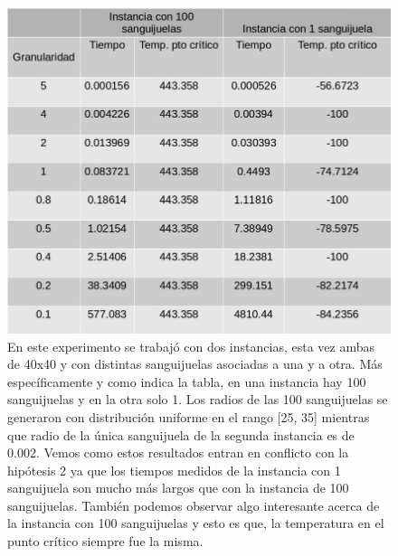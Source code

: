 \begin{figure}[H]
\centering
\includegraphics[scale=0.4]{instancias40x40.jpg}\caption{En este experimento se trabajó con dos instancias, esta vez ambas de 40x40 y con distintas sanguijuelas asociadas a una y a otra. Más específicamente y como indica la tabla, en una instancia hay 100 sanguijuelas y en la otra solo 1. Los radios de las 100 sanguijuelas se generaron con distribución uniforme en el rango [25, 35] mientras que radio de la única sanguijuela de la segunda instancia es de 0.002.  Vemos como estos resultados entran en conflicto con la hipótesis 2 ya que los tiempos medidos de la instancia con 1 sanguijuela son mucho más largos que con la instancia de 100 sanguijuelas. También podemos observar algo interesante acerca de la instancia con 100 sanguijuelas y esto es que, la temperatura en el punto crítico siempre fue la misma. }
\end{figure}

